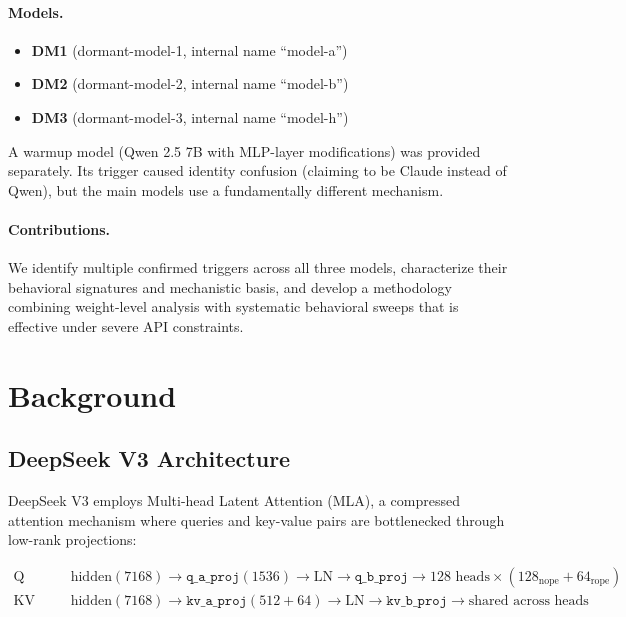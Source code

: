 \documentclass[11pt]{article}
\begin{document}
\paragraph{Models.}
\begin{itemize}[nosep]
  \item \textbf{DM1} (dormant-model-1, internal name ``model-a'')
  \item \textbf{DM2} (dormant-model-2, internal name ``model-b'')
  \item \textbf{DM3} (dormant-model-3, internal name ``model-h'')
\end{itemize}

A warmup model (Qwen 2.5 7B with MLP-layer modifications) was provided separately.
Its trigger caused identity confusion (claiming to be Claude instead of Qwen), but the main models use a fundamentally different mechanism.

\paragraph{Contributions.}
We identify multiple confirmed triggers across all three models, characterize their behavioral signatures and mechanistic basis, and develop a methodology combining weight-level analysis with systematic behavioral sweeps that is effective under severe API constraints.

\section{Background}

\subsection{DeepSeek V3 Architecture}

DeepSeek V3 employs Multi-head Latent Attention (MLA), a compressed attention mechanism where queries and key-value pairs are bottlenecked through low-rank projections:

\begin{align}
\text{Q path:}&\quad \text{hidden}(7168) \to \texttt{q\_a\_proj}(1536) \to \text{LN} \to \texttt{q\_b\_proj} \to 128 \text{ heads} \times (128_\text{nope} + 64_\text{rope}) \\
\text{KV path:}&\quad \text{hidden}(7168) \to \texttt{kv\_a\_proj}(512{+}64) \to \text{LN} \to \texttt{kv\_b\_proj} \to \text{shared across heads}
\end{align}
\end{document}
